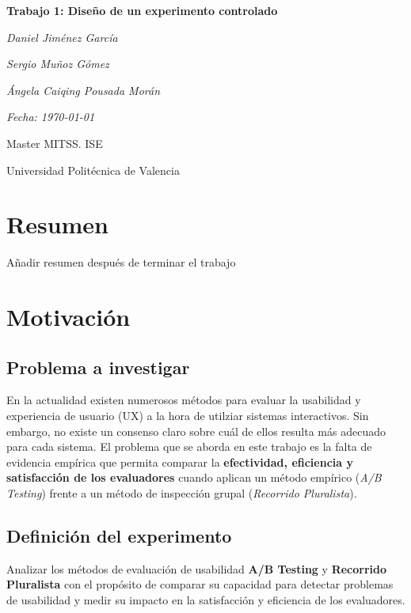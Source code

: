 \documentclass[a4paper,12pt]{report}
\begin{document}
\begin{titlepage}
    \centering
    \vspace*{3cm}
    {\Huge\bfseries Trabajo 1: Diseño de un experimento controlado \par}
    \vspace{2cm}
    {\Large\itshape Daniel Jiménez García \par}
    {\Large\itshape Sergio Muñoz Gómez \par}
    {\Large\itshape Ángela Caiqing Pousada Morán \par}
    \vspace{1cm}
    {\Large\itshape Fecha: \today \par}
    \vfill
    {\large Master MITSS. ISE \par}
    {\large Universidad Politécnica de Valencia\par}
\end{titlepage}


\chapter*{Resumen}

Añadir resumen después de terminar el trabajo


\chapter{Motivación}

\section{Problema a investigar}
En la actualidad existen numerosos métodos para evaluar la usabilidad y experiencia de usuario (UX) a la hora de utilziar sistemas interactivos. Sin embargo, no existe un consenso claro sobre cuál de ellos resulta más adecuado para cada sistema.  
El problema que se aborda en este trabajo es la falta de evidencia empírica que permita comparar la \textbf{efectividad, eficiencia y satisfacción de los evaluadores} cuando aplican un método empírico (\textit{A/B Testing}) frente a un método de inspección grupal (\textit{Recorrido Pluralista}).

\section{Definición del experimento}
Analizar los métodos de evaluación de usabilidad \textbf{A/B Testing} y \textbf{Recorrido Pluralista} con el propósito de comparar su capacidad para detectar problemas de usabilidad y medir su impacto en la satisfacción y eficiencia de los evaluadores.
\end{document}
